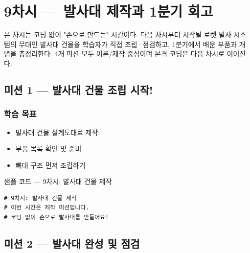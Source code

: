 \section{9차시 --- 발사대 제작과 1분기 회고}
\label{sec:ch09}

본 차시는 코딩 없이 "손으로 만드는" 시간이다. 다음 차시부터 시작될
로켓 발사 시스템의 무대인 발사대 건물을 학습자가 직접 조립·점검하고,
1분기에서 배운 부품과 개념을 총정리한다. 4개 미션 모두 이론/제작
중심이며 본격 코딩은 다음 차시로 이어진다.

\subsection{미션 1 --- 발사대 건물 조립 시작!}
\label{subsec:ch09-m1}

\begin{storybox}
\end{storybox}

\subsubsection*{학습 목표}
\begin{itemize}[leftmargin=1.4em]
  \item 발사대 건물 설계도대로 제작
  \item 부품 목록 확인 및 준비
  \item 뼈대 구조 먼저 조립하기
\end{itemize}

\begin{labbox}{샘플 코드 --- 9차시: 발사대 건물 제작}
\begin{verbatim}
# 9차시: 발사대 건물 제작
# 이번 시간은 제작 미션입니다.
# 코딩 없이 손으로 발사대를 만들어요!
\end{verbatim}
\end{labbox}

\subsection{미션 2 --- 발사대 완성 및 점검}
\label{subsec:ch09-m2}

\begin{storybox}
\end{storybox}

